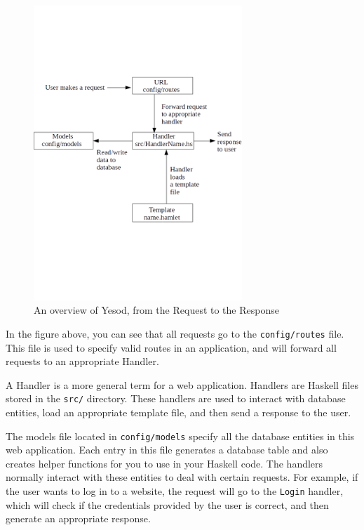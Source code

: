 \begin{figure}[H]
	\centering
	\includegraphics[width=0.7\textwidth]{final_report/pics/yesod_diagram.png}
	\caption{An overview of Yesod, from the Request to the Response}
	\label{fig:yesodOverview}
\end{figure}

In the figure above, you can see that all requests go to the \texttt{config/routes}
file. This file is used to specify valid routes in an application, and will
forward all requests to an appropriate Handler. \parencite[Understanding a Request]{yesodBook}

A Handler is a more general term for a web application. Handlers are Haskell
files stored in the \texttt{src/} directory. These handlers are used to interact
with database entities, load an appropriate template file, and then send
a response to the user. \parencite[Understanding a Request]{yesodBook}

The models file located in \texttt{config/models} specify all the database
entities in this web application. Each entry in this file generates a database
table and also creates helper functions for you to use in your Haskell code.
The handlers normally interact with these entities to deal with certain requests.
For example, if the user wants to log in to a website, the request will go to the
\texttt{Login} handler, which will check if the credentials provided by the user
is correct, and then generate an appropriate response.

